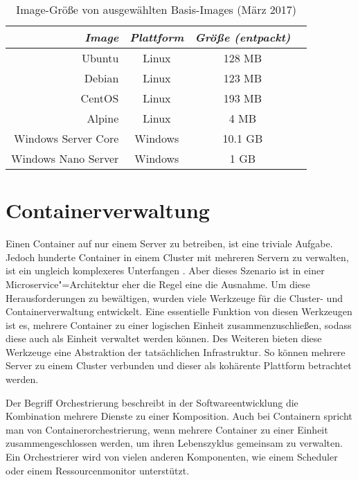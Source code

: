 \begin{table}[!hbt]
\caption{Image-Größe von ausgewählten Basis-Images (März 2017)}
\label{tab:docker-image-size}
\centering
\setlength{\tabcolsep}{5mm} %
\def\arraystretch{1.25} %
\begin{tabular}{|r||c|c|c|}
\hline
\emph{Image} & \emph{Plattform} & \emph{Größe (entpackt)} \\
\hline
\hline
Ubuntu & Linux & 128 MB \\
\hline
Debian & Linux & 123 MB \\
\hline
CentOS & Linux & 193 MB \\
\hline
Alpine & Linux & 4 MB \\
\hline
Windows Server Core & Windows & 10.1 GB \\
\hline
Windows Nano Server & Windows & 1 GB \\
\hline
\end{tabular}
\end{table}

\section{Containerverwaltung}

Einen Container auf nur einem Server zu betreiben, ist eine triviale Aufgabe. Jedoch hunderte Container in einem Cluster mit mehreren Servern zu verwalten, ist ein ungleich komplexeres Unterfangen \cite{RussinovicContainers}. Aber dieses Szenario ist in einer Microservice"=Architektur eher die Regel eine die Ausnahme. Um diese Herausforderungen zu bewältigen, wurden viele Werkzeuge für die Cluster- und Containerverwaltung entwickelt. Eine essentielle Funktion von diesen Werkzeugen ist es, mehrere Container zu einer logischen Einheit zusammenzuschließen, sodass diese auch als Einheit verwaltet werden können. Des Weiteren bieten diese Werkzeuge eine Abstraktion der tatsächlichen Infrastruktur. So können mehrere Server zu einem Cluster verbunden und dieser als kohärente Plattform betrachtet werden. 

Der Begriff Orchestrierung beschreibt in der Softwareentwicklung die Kombination mehrere Dienste zu einer Komposition. Auch bei Containern spricht man von Containerorchestrierung, wenn mehrere Container zu einer Einheit zusammengeschlossen werden, um ihren Lebenszyklus gemeinsam zu verwalten. Ein Orchestrierer wird von vielen anderen Komponenten, wie \zB einem Scheduler oder einem Ressourcenmonitor unterstützt. 

